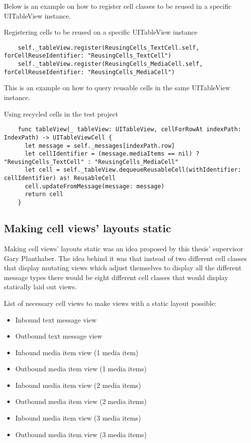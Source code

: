 \documentclass[a4paper,12pt]{article}
\begin{document}
\newpage %
Below is an example on how to register cell classes to be reused in a specific UITableView instance.
\begin{listing}[H]
  \caption{Registering cells to be reused on a specific UITableView instance}
  \begin{verbatim}
    self._tableView.register(ReusingCells_TextCell.self, forCellReuseIdentifier: "ReusingCells_TextCell")
    self._tableView.register(ReusingCells_MediaCell.self, forCellReuseIdentifier: "ReusingCells_MediaCell")
  \end{verbatim}
\end{listing}

This is an example on how to query reusable cells in the same UITableView instance.
\begin{listing}[H]
  \caption{Using recycled cells in the test project}
  \begin{verbatim}
    func tableView(_ tableView: UITableView, cellForRowAt indexPath: IndexPath) -> UITableViewCell {
      let message = self._messages[indexPath.row]
      let cellIdentifier = (message.mediaItems == nil) ? "ReusingCells_TextCell" : "ReusingCells_MediaCell"
      let cell = self._tableView.dequeueReusableCell(withIdentifier: cellIdentifier) as! ReusableCell
      cell.updateFromMessage(message: message)
      return cell
    }
  \end{verbatim}
\end{listing}

\subsection{Making cell views' layouts static}
Making cell views' layouts static was an idea proposed by this thesis' supervisor Gary Planthaber. The idea behind it was that instead of two different cell classes that display mutating views which adjust themselves to display all the different message types there would be eight different cell classes that would display statically laid out views.

List of necessary cell views to make views with a static layout possible:
\begin{itemize}
  \item Inbound text message view
  \item Outbound text message view
  \item Inbound media item view (1 media item)
  \item Outbound media item view (1 media items)
  \item Inbound media item view (2 media items)
  \item Outbound media item view (2 media items)
  \item Inbound media item view (3 media items)
  \item Outbound media item view (3 media items)
\end{itemize}
\end{document}
